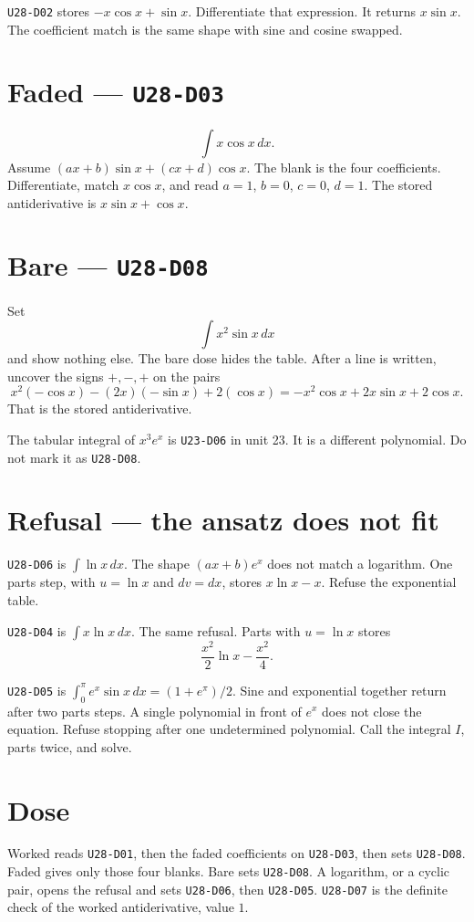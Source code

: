 \texttt{U28-D02} stores $-x\cos x+\sin x$. Differentiate that expression. It returns $x\sin x$. The coefficient match is the same shape with sine and cosine swapped.

\section{Faded --- \texttt{U28-D03}}
\[
\int x\cos x\,dx.
\]
Assume $(ax+b)\sin x+(cx+d)\cos x$. The blank is the four coefficients. Differentiate, match $x\cos x$, and read $a=1$, $b=0$, $c=0$, $d=1$. The stored antiderivative is $x\sin x+\cos x$.

\section{Bare --- \texttt{U28-D08}}
Set
\[
\int x^2\sin x\,dx
\]
and show nothing else. The bare dose hides the table. After a line is written, uncover the signs $+,-,+$ on the pairs
\[
x^2(-\cos x)-(2x)(-\sin x)+2(\cos x)=-x^2\cos x+2x\sin x+2\cos x.
\]
That is the stored antiderivative.

The tabular integral of $x^3 e^x$ is \texttt{U23-D06} in unit 23. It is a different polynomial. Do not mark it as \texttt{U28-D08}.

\section{Refusal --- the ansatz does not fit}
\texttt{U28-D06} is $\int\ln x\,dx$. The shape $(ax+b)e^x$ does not match a logarithm. One parts step, with $u=\ln x$ and $dv=dx$, stores $x\ln x-x$. Refuse the exponential table.

\texttt{U28-D04} is $\int x\ln x\,dx$. The same refusal. Parts with $u=\ln x$ stores
\[
\frac{x^2}{2}\ln x-\frac{x^2}{4}.
\]

\texttt{U28-D05} is $\int_0^{\pi}e^x\sin x\,dx=(1+e^{\pi})/2$. Sine and exponential together return after two parts steps. A single polynomial in front of $e^x$ does not close the equation. Refuse stopping after one undetermined polynomial. Call the integral $I$, parts twice, and solve.

\section{Dose}
Worked reads \texttt{U28-D01}, then the faded coefficients on \texttt{U28-D03}, then sets \texttt{U28-D08}. Faded gives only those four blanks. Bare sets \texttt{U28-D08}. A logarithm, or a cyclic pair, opens the refusal and sets \texttt{U28-D06}, then \texttt{U28-D05}. \texttt{U28-D07} is the definite check of the worked antiderivative, value $1$.

